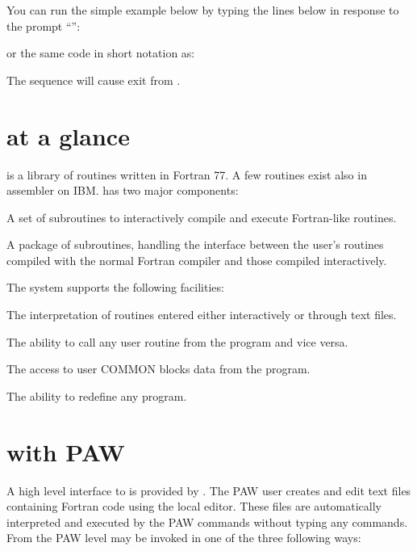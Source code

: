 You can run the simple example below by typing the lines
below in response to the \COMIS{} prompt ``'':
\begin{alltt}
\end{alltt}
or the same code in short notation as: 
 
The sequence  will cause exit from \COMIS{}.

\section{\COMIS{} at a glance}
 
\COMIS{} is a library of routines written in Fortran 77. 
A few routines exist also in assembler on IBM. 
\COMIS{} has two major components:

\begin{UL}
\item A set of subroutines to interactively compile and execute
      Fortran-like routines.
\item A package of subroutines, handling the interface between
      the user's routines compiled with the normal Fortran compiler
      and those compiled interactively.
\end{UL}
 
The \COMIS{} system supports the following facilities:
\begin{UL}
\item The interpretation of \COMIS{} routines entered
      either interactively or through text files.
\item The ability to call any user routine from the \COMIS{}
      program  and vice versa.
\item The access to user COMMON blocks data from the
      \COMIS{} program.
\item The ability to redefine any \COMIS{} program.
\end{UL}

\section{\COMIS{} with PAW}
\label{sec:comis-with-paw}
 
A high level interface to \COMIS{} is provided by \PAW.
The PAW user creates and edit text files containing Fortran code
using the local editor. These files are automatically interpreted
and executed by the PAW commands without typing any \COMIS{} commands.
From the PAW level \COMIS{} may be invoked in one of the three following
ways:

